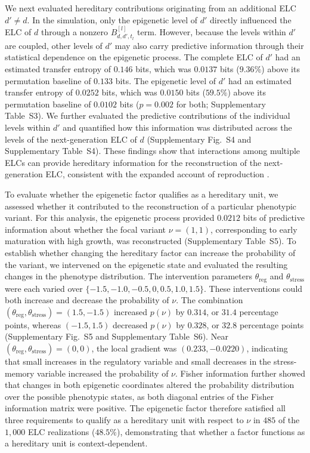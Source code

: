 \documentclass[pdflatex,sn-mathphys-num]{sn-jnl}
\theoremstyle{thmstylethree}
\theoremstyle{thmstyleone}
\begin{document}
We next evaluated hereditary contributions originating from an additional ELC $d'\neq d$. In the simulation, only the epigenetic level of $d'$ directly influenced the ELC of $d$ through a nonzero $B_{d,d',t_l}^{[l]}$ term. However, because the levels within $d'$ are coupled, other levels of $d'$ may also carry predictive information through their statistical dependence on the epigenetic process. The complete ELC of $d'$ had an estimated transfer entropy of $0.146$ bits, which was $0.0137$ bits ($9.36\%$) above its permutation baseline of $0.133$ bits. The epigenetic level of $d'$ had an estimated transfer entropy of $0.0252$ bits, which was $0.0150$ bits ($59.5\%$) above its permutation baseline of $0.0102$ bits ($p=0.002$ for both; Supplementary Table~S3). We further evaluated the predictive contributions of the individual levels within $d'$ and quantified how this information was distributed across the levels of the next-generation ELC of $d$ (Supplementary Fig.~S4 and Supplementary Table~S4). These findings show that interactions among multiple ELCs can provide hereditary information for the reconstruction of the next-generation ELC, consistent with the expanded account of reproduction \cite{etxeberria2026expanded}.

To evaluate whether the epigenetic factor qualifies as a hereditary unit, we assessed whether it contributed to the reconstruction of a particular phenotypic variant. For this analysis, the epigenetic process provided $0.0212$ bits of predictive information about whether the focal variant $\nu=(1,1)$, corresponding to early maturation with high growth, was reconstructed (Supplementary Table~S5). To establish whether changing the hereditary factor can increase the probability of the variant, we intervened on the epigenetic state and evaluated the resulting changes in the phenotype distribution. The intervention parameters $\theta_{\mathrm{reg}}$ and $\theta_{\mathrm{stress}}$ were each varied over $\{-1.5,-1.0,-0.5,0,0.5,1.0,1.5\}$. These interventions could both increase and decrease the probability of $\nu$. The combination $(\theta_{\mathrm{reg}},\theta_{\mathrm{stress}})=(1.5,-1.5)$ increased $p(\nu)$ by $0.314$, or $31.4$ percentage points, whereas $(-1.5,1.5)$ decreased $p(\nu)$ by $0.328$, or $32.8$ percentage points (Supplementary Fig.~S5 and Supplementary Table~S6). Near $(\theta_{\mathrm{reg}},\theta_{\mathrm{stress}})=(0,0)$, the local gradient was $(0.233,-0.0220)$, indicating that small increases in the regulatory variable and small decreases in the stress-memory variable increased the probability of $\nu$. Fisher information further showed that changes in both epigenetic coordinates altered the probability distribution over the possible phenotypic states, as both diagonal entries of the Fisher information matrix were positive. The epigenetic factor therefore satisfied all three requirements to qualify as a hereditary unit with respect to $\nu$ in $485$ of the $1{,}000$ ELC realizations ($48.5\%$), demonstrating that whether a factor functions as a hereditary unit is context-dependent. 
\end{document}
